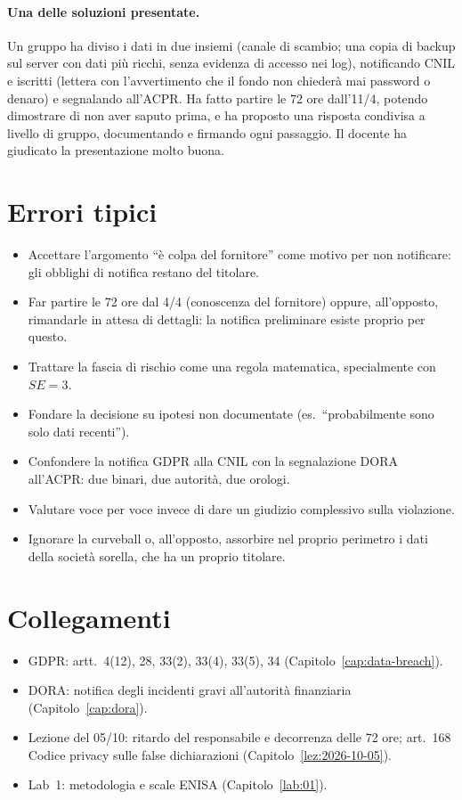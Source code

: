 \paragraph{Una delle soluzioni presentate.} Un gruppo ha diviso i dati in due insiemi (canale di
scambio; una copia di backup sul server con dati più ricchi, senza evidenza di accesso nei log),
notificando CNIL e iscritti (lettera con l'avvertimento che il fondo non chiederà mai password o
denaro) e segnalando all'ACPR. Ha fatto partire le 72 ore dall'11/4, potendo dimostrare di non aver
saputo prima, e ha proposto una risposta condivisa a livello di gruppo, documentando e firmando ogni
passaggio. Il docente ha giudicato la presentazione molto buona.

\section{Errori tipici}
\begin{itemize}
  \item Accettare l'argomento ``è colpa del fornitore'' come motivo per non notificare: gli obblighi
    di notifica restano del titolare.
  \item Far partire le 72 ore dal 4/4 (conoscenza del fornitore) oppure, all'opposto, rimandarle in
    attesa di dettagli: la notifica preliminare esiste proprio per questo.
  \item Trattare la fascia di rischio come una regola matematica, specialmente con $SE = 3$.
  \item Fondare la decisione su ipotesi non documentate (es.\ ``probabilmente sono solo dati
    recenti'').
  \item Confondere la notifica GDPR alla CNIL con la segnalazione DORA all'ACPR: due binari, due
    autorità, due orologi.
  \item Valutare voce per voce invece di dare un giudizio complessivo sulla violazione.
  \item Ignorare la curveball o, all'opposto, assorbire nel proprio perimetro i dati della società
    sorella, che ha un proprio titolare.
\end{itemize}

\section{Collegamenti}
\begin{itemize}
  \item GDPR: artt.~4(12), 28, 33(2), 33(4), 33(5), 34 (Capitolo~\ref{cap:data-breach}).
  \item DORA: notifica degli incidenti gravi all'autorità finanziaria (Capitolo~\ref{cap:dora}).
  \item Lezione del 05/10: ritardo del responsabile e decorrenza delle 72 ore; art.~168 Codice privacy
    sulle false dichiarazioni (Capitolo~\ref{lez:2026-10-05}).
  \item Lab~1: metodologia e scale ENISA (Capitolo~\ref{lab:01}).
\end{itemize}

